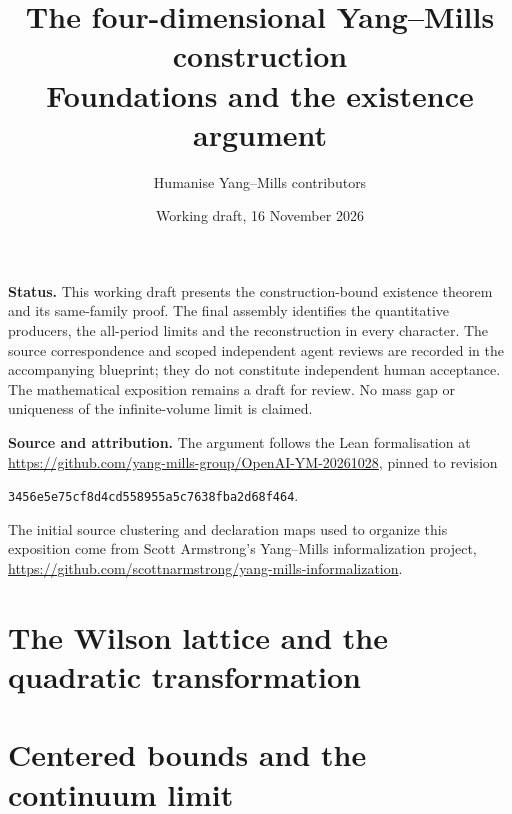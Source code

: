 \documentclass[11pt]{article}
\title{The four-dimensional Yang--Mills construction\\
\large Foundations and the existence argument}
\author{Humanise Yang--Mills contributors}
\date{Working draft, 16 November 2026}
\theoremstyle{remark}
\numberwithin{equation}{section}
\begin{document}
\maketitle
\noindent\textbf{Status.} This working draft presents the construction-bound
existence theorem and its same-family proof. The final assembly identifies
the quantitative producers, the all-period limits and the reconstruction
in every character. The source correspondence and scoped independent agent
reviews are recorded in the accompanying blueprint; they do not constitute
independent human acceptance. The mathematical exposition remains a draft
for review. No mass gap or uniqueness of the infinite-volume limit is claimed.
\par\medskip
\noindent\textbf{Source and attribution.} The argument follows the Lean
formalisation at
\url{https://github.com/yang-mills-group/OpenAI-YM-20261028},
pinned to revision
\begin{center}
\texttt{3456e5e75cf8d4cd558955a5c7638fba2d68f464}.
\end{center}
The initial source clustering and declaration maps used to organize this
exposition come from Scott Armstrong's Yang--Mills informalization project,
\url{https://github.com/scottnarmstrong/yang-mills-informalization}.
\setcounter{tocdepth}{2}
\tableofcontents


\section{The Wilson lattice and the quadratic transformation}
















\section{Centered bounds and the continuum limit}












\end{document}
